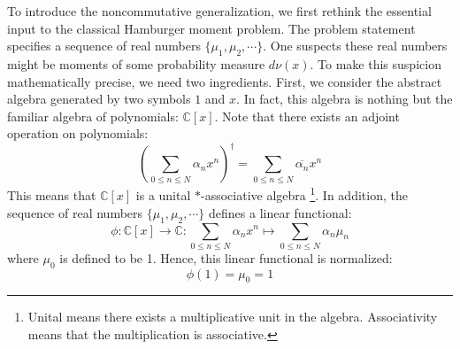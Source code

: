 \documentclass[a4paper,11pt]{article}
\theoremstyle{definition}
\numberwithin{equation}{section}
\begin{document}
To introduce the noncommutative generalization, we first rethink the essential input to the classical Hamburger moment problem. The problem statement specifies a sequence of real numbers $\{\mu_1,\mu_2,\cdots\}$. One suspects these real numbers might be moments of some probability measure $d\nu(x)$. To make this suspicion mathematically precise, we need two ingredients. First, we consider the abstract algebra generated by two symbols $1$ and $x$. In fact, this algebra is nothing but the familiar algebra of polynomials: $\mathbb{C}[x]$. Note that there exists an adjoint operation on polynomials:
\begin{equation}
    (\sum_{0\leq n\leq N}\alpha_nx^n)^\dagger = \sum_{0\leq n\leq N}\overline{\alpha_n}x^n
\end{equation}
This means that $\mathbb{C}[x]$ is a unital $*$-associative algebra \footnote{Unital means there exists a multiplicative unit in the algebra. Associativity means that the multiplication is associative.}. In addition, the sequence of real numbers $\{\mu_1,\mu_2,\cdots\}$ defines a linear functional:
\begin{equation}
    \phi:\mathbb{C}[x]\rightarrow\mathbb{C}:\sum_{0\leq n\leq N}\alpha_nx^n\mapsto \sum_{0\leq n\leq N}\alpha_n\mu_n
\end{equation}
where $\mu_0$ is defined to be 1. Hence, this linear functional is normalized:
\begin{equation}
    \phi(1) = \mu_0 = 1
\end{equation}
\end{document}
